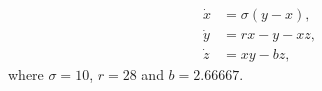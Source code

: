 \begin{align}
  \dot{x} &= \sigma\left(y-x\right), \label{eq:lorenz-equations-x} \\
  \dot{y} &= rx-y-xz, \label{eq:lorenz-equations-y} \\
  \dot{z} &= xy-bz, \label{eq:lorenz-equations-z}
\end{align}
where $\sigma = 10$, $r = 28$ and $b = 2.66667$.
